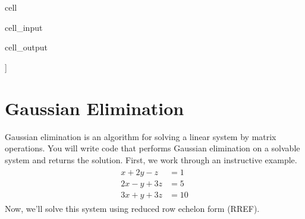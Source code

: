 \documentclass[letterpaper,10pt,english]{jupyterBook}
\begin{document}
\begin{sphinxuseclass}{cell}\begin{sphinxVerbatimInput}

\begin{sphinxuseclass}{cell_input}
\begin{sphinxVerbatim}[commandchars=\\\{\}]
   
\end{sphinxVerbatim}

\end{sphinxuseclass}\end{sphinxVerbatimInput}
\begin{sphinxVerbatimOutput}

\begin{sphinxuseclass}{cell_output}
\begin{sphinxVerbatim}[commandchars=\\\{\}]
[[0 0 0 0 0]
 [0 0 0 0 0]
 [0 0 0 0 0]
 [0 0 0 0 0]
 [0 0 0 0 0]]
\end{sphinxVerbatim}

\end{sphinxuseclass}\end{sphinxVerbatimOutput}

\end{sphinxuseclass}
\sphinxstepscope


\chapter{Gaussian Elimination}
\label{\detokenize{lessons/Gaussian_Elimination-student:gaussian-elimination}}\label{\detokenize{lessons/Gaussian_Elimination-student::doc}}
\sphinxAtStartPar
Gaussian elimination is an algorithm for solving  a linear system by matrix operations. You will write code that performs Gaussian elimination on a solvable system and returns the solution. First, we work through an instructive example.
\begin{equation*}
\begin{split}
\begin{aligned}
x + 2y - z &= 1 \\
2x - y + 3z &= 5 \\
3x + y + 3z &= 10
\end{aligned}
\end{split}
\end{equation*}
\sphinxAtStartPar
Now, we’ll solve this system using reduced row echelon form (RREF).
\end{document}
